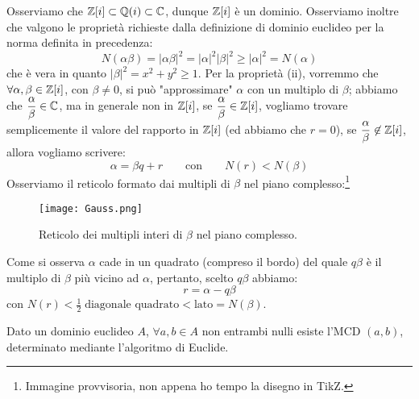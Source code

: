 \documentclass[11pt]{scrartcl}
\begin{document}
Osserviamo che $\mathbb Z[i] \subset \mathbb Q(i) \subset \mathbb C$, dunque $\mathbb Z[i]$ è un dominio. Osserviamo inoltre che valgono le proprietà richieste dalla definizione di dominio euclideo per la norma 
definita in precedenza:
\[ N(\alpha\beta) = |\alpha\beta|^2 = |\alpha|^2|\beta|^2 \geq |\alpha|^2 = N(\alpha)
    \]
che è vera in quanto $|\beta|^2 = x^2+y^2 \geq 1$. Per la proprietà (ii), vorremmo che $\forall \alpha,\beta \in \mathbb Z[i]$, con $\beta \ne 0$, si può "approssimare" $\alpha$ con un multiplo di $\beta$;
abbiamo che $\displaystyle \frac{\alpha}{\beta} \in \mathbb C$, ma in generale non in $\mathbb Z[i]$, se $\displaystyle\frac{\alpha}{\beta} \in \mathbb Z[i]$, vogliamo trovare semplicemente il valore del rapporto in
$\mathbb Z[i]$ (ed abbiamo che $r = 0$), se $\displaystyle\frac{\alpha}{\beta} \not\in \mathbb Z[i]$, allora vogliamo scrivere:
\[ \alpha = \beta q + r \qquad \text{con}\qquad N(r) < N(\beta)
    \]
Osserviamo il reticolo formato dai multipli di $\beta$ nel piano complesso:\footnote{Immagine provvisoria, non appena ho tempo la disegno in TikZ.}

\begin{figure}[h]
    \centering
    \texttt{[image: Gauss.png]}
    \caption{Reticolo dei multipli interi di $\beta$ nel piano complesso.}
\end{figure}

Come si osserva $\alpha$ cade in un quadrato (compreso il bordo) del quale $q\beta$ è il multiplo di $\beta$ più vicino ad $\alpha$, pertanto, scelto $q\beta$ abbiamo:
\[ r = \alpha - q\beta
    \]
con $\displaystyle N(r) < \frac{1}{2} \; \text{diagonale quadrato} < \text{lato} = N(\beta)$.

\begin{proposition}
    Dato un dominio euclideo $A$, $\forall a,b \in A$ non entrambi nulli esiste l'MCD $(a,b)$, determinato mediante l'algoritmo di Euclide.
\end{proposition}
\end{document}
